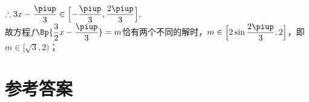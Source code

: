 \begin{answer}
\begin{center}
\begin{tikzpicture}[>=latex,,scale=1,declare function={f(\k)=2*sin(deg(3*\k-pi/3));}]
            \end{tikzpicture}
          \end{center}
          $\therefore 3x-\dfrac{\piup}3\in\Bigl[-\dfrac{\piup}3,\dfrac{2\piup}3\Bigr]$,\\
          故方程$f\Bp{\dfrac32x-\dfrac{\piup}3}=m$恰有两个不同的解时，$m\in\Bigl[2\sin\dfrac{2\piup}3,2\Bigr]$，即\\
          $m\in[\sqrt3,2)$；
    \end{answer}

\part{\heiti \xiaoer 参考答案}

